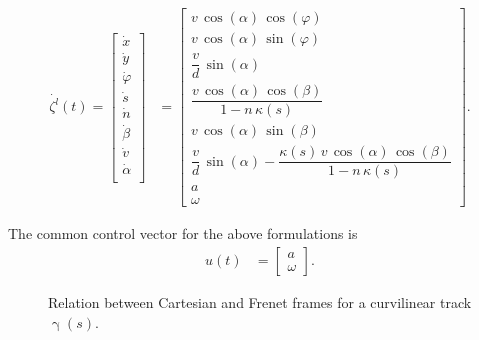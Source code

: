 \begin{align}
    \dot{\zeta^{l}}(t) = \begin{bmatrix}
        \dot{x}\\
        \dot{y}\\
        \dot{\varphi}\\
        \dot{s}\\
        \dot{n}\\
        \dot{\beta}\\
        \dot{v}\\
        \dot{\alpha}\\
    \end{bmatrix} &= 
    \begin{bmatrix}
        v\, \cos(\alpha)\, \cos(\varphi)\\
        v\, \cos(\alpha)\, \sin(\varphi)\\
        \dfrac{v}{d}\, \sin(\alpha)\\
        \dfrac{v\, \cos(\alpha)\, \cos(\beta)}{1 - n\, \kappa(s)}\\
        v\, \cos(\alpha)\, \sin(\beta)\\
        \dfrac{v}{d}\, \sin(\alpha) - \dfrac{\kappa(s)\, v\, \cos(\alpha)\, \cos(\beta)}{1 - n\, \kappa(s)}\\
        a\\
        \omega \label{eqZetaL}
    \end{bmatrix}.
\end{align}

The common control vector for the above formulations is
\begin{align}
u(t) &= 
\begin{bmatrix}
    a \\
    \omega \label{eqU}
\end{bmatrix}.
\end{align}

\begin{figure}[h!tbp]
    \begin{center}
        \def\svgwidth{0.75\textwidth}
        
        \caption{Relation between Cartesian and Frenet frames for a curvilinear track $\upgamma(s)$.}
        \label{cart_fren_tf}
    \end{center}
\end{figure}

